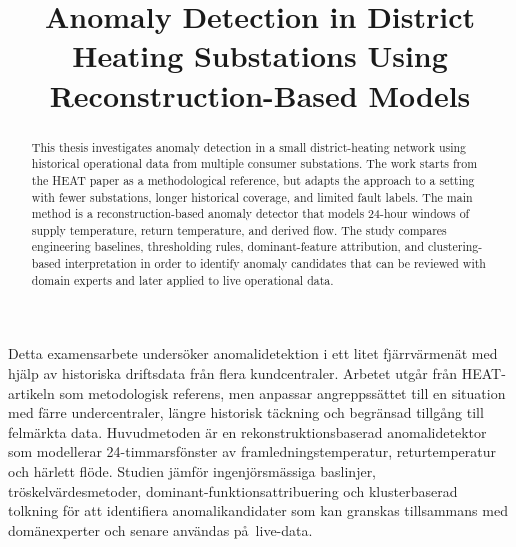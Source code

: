 \documentclass[manuscript, screen]{timtm}
\newcommand{\alttitle}[1]{}
\newenvironment{swedishabstract}{}{}
\begin{document}


\title[Anomaly Detection in District Heating Substations]{Anomaly Detection in District Heating Substations Using Reconstruction-Based Models}
\alttitle{Anomalidetektion i fj\"arrv\"armecentraler med rekonstruktionsbaserade modeller}

\makeatletter
\author{\@authorsFirstname\space\@authorsLastname}
\email{\@email}
\if\relax\detokenize\expandafter{\@secondAuthorsFirstname}\relax\else
\author{\@secondAuthorsFirstname\space\@secondAuthorsLastname}
\email{\@secondemail}
\fi
{}
\makeatother

\begin{abstract}
\begin{scontents}[store-env=abstracts,print-env=false]
This thesis investigates anomaly detection in a small district-heating network using historical operational data from multiple consumer substations. The work starts from the HEAT paper as a methodological reference, but adapts the approach to a setting with fewer substations, longer historical coverage, and limited fault labels. The main method is a reconstruction-based anomaly detector that models 24-hour windows of supply temperature, return temperature, and derived flow. The study compares engineering baselines, thresholding rules, dominant-feature attribution, and clustering-based interpretation in order to identify anomaly candidates that can be reviewed with domain experts and later applied to live operational data.
\end{scontents}
\end{abstract}

\begin{swedishabstract}
\begin{scontents}[store-env=abstracts,print-env=false]
Detta examensarbete unders\"oker anomalidetektion i ett litet fj\"arrv\"armen\"at med hj\"alp av historiska driftsdata fr\aa n flera kundcentraler. Arbetet utg\aa r fr\aa n HEAT-artikeln som metodologisk referens, men anpassar angreppss\"attet till en situation med f\"arre undercentraler, l\"angre historisk t\"ackning och begr\"ansad tillg\aa ng till felm\"arkta data. Huvudmetoden \"ar en rekonstruktionsbaserad anomalidetektor som modellerar 24-timmarsf\"onster av framledningstemperatur, returtemperatur och h\"arlett fl\"ode. Studien j\"amf\"or ingenj\"orsm\"assiga baslinjer, tr\"oskelv\"ardesmetoder, dominant-funktionsattribuering och klusterbaserad tolkning f\"or att identifiera anomalikandidater som kan granskas tillsammans med dom\"anexperter och senare anv\"andas p\aa\ live-data.
\end{scontents}
\end{swedishabstract}
\end{document}
